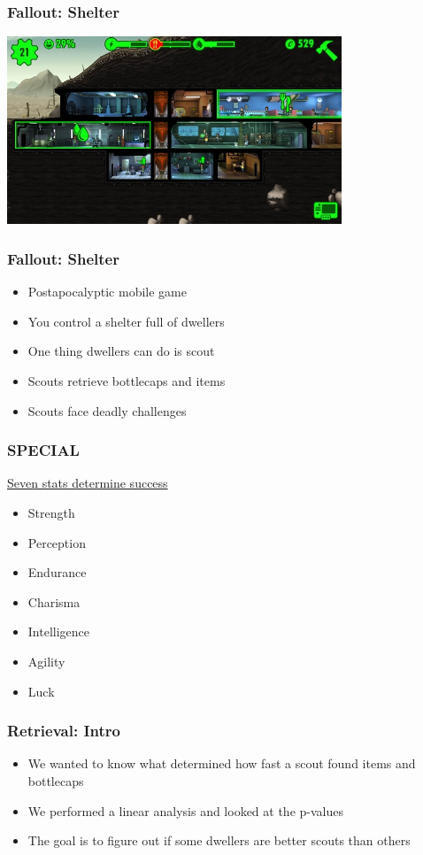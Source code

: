 \documentclass{beamer}
\begin{document}
\begin{frame}
  \frametitle{Fallout: Shelter}
  \includegraphics[width=10cm]{Fallout_Shelter_gameplay}
\end{frame}

\begin{frame}
  \frametitle{Fallout: Shelter}
  \begin{itemize}
  \item Postapocalyptic mobile game
  \item You control a shelter full of dwellers
  \item One thing dwellers can do is scout
  \item Scouts retrieve bottlecaps and items
  \item Scouts face deadly challenges
  \end{itemize}
\end{frame}


\begin{frame}
  \frametitle{SPECIAL}

{\Large \underline{Seven stats determine success}}
  \begin{itemize}
  \item Strength
  \item Perception 
  \item Endurance 
  \item Charisma 
  \item Intelligence 
  \item Agility 
  \item Luck 
  \end{itemize}
\end{frame}


\begin{frame}
  \frametitle{Retrieval: Intro}
  \begin{itemize}
  \item We wanted to know what determined how fast a scout found items and bottlecaps
  \item We performed a linear analysis and looked at the p-values
  \item The goal is to figure out if some dwellers are better scouts than others
  \end{itemize}

\end{frame}
\end{document}
